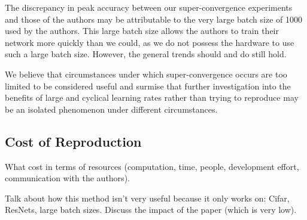\documentclass[10pt,twocolumn,letterpaper]{article}
\begin{document}
The discrepancy in peak accuracy between our super-convergence experiments and
those of the authors may be attributable to the very large batch size of 1000
used by the authors. This large batch size allows the authors to train their
network more quickly than we could, as we do not possess the hardware to use
such a large batch size. However, the general trends should and do still hold.

We believe that circumstances under which super-convergence occurs are too
limited to be considered useful and surmise that further investigation into the
benefits of large and cyclical learning rates rather than trying to reproduce
may be an isolated phenomenon under different circumstances.

\subsection{Cost of Reproduction}
What cost in terms of resources (computation, time, people, development effort,
communication with the authors).

Talk about how this method isn't very useful because it only works on: Cifar,
ResNets, large batch sizes. Discuss the impact of the paper (which is very
low).

{\small


}
\end{document}
